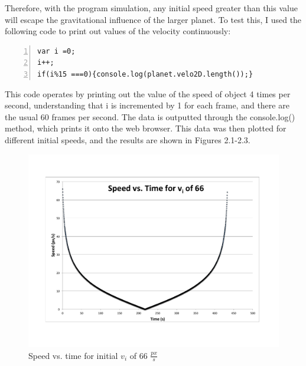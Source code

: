 Therefore, with the program simulation, any initial speed greater than this value will escape the gravitational influence of the larger planet.  To test this, I used the following code to print out values of the velocity continuously:

\begin{lstlisting}[breaklines=true, frame=single, numbers=left, caption=Code for printing out values of speed, label=lst:changestoorbit]
var i =0;
i++;
if(i%15 ===0){console.log(planet.velo2D.length());}
\end{lstlisting}

This code operates by printing out the value of the speed of object 4 times per second, understanding that i is incremented by 1 for each frame, and there are the usual 60 frames per second.  The data is outputted through the console.log() method, which prints it onto the web browser.  This data was then plotted for different initial speeds, and the results are shown in Figures 2.1-2.3.


\begin{figure}[h] 
	\centering
		\includegraphics[width=12cm]{Figures/fig1.pdf}

	\caption{Speed vs. time for initial $v_i$ of 66 $\frac{px}{s}$}
	\label{fig:data1}
\end{figure}


